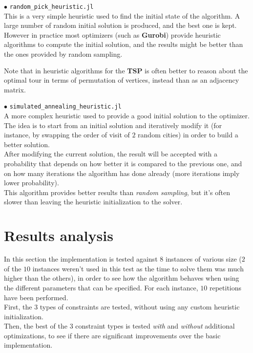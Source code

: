 \documentclass[
12pt,
a4paper,
oneside,
headinclude,
footinclude]{article}
\begin{document}
    $\bullet$ \texttt{random\_pick\_heuristic.jl}\\
    This is a very simple heuristic used to find the initial state of the algorithm. A large number of random initial solution is produced, and the best one is kept.\\
    However in practice most optimizers (such as \textbf{Gurobi}) provide heuristic algorithms to compute the initial solution, and the results might be better than the ones provided by random sampling.
    
    Note that in heuristic algorithms for the \textbf{TSP} is often better to reason about the optimal tour in terms of permutation of vertices, instead than as an adjacency matrix.
    
    
    $\bullet$ \texttt{simulated\_annealing\_heuristic.jl}\\
    A more complex heuristic used to provide a good initial solution to the optimizer.\\
    The idea is to start from an initial solution and iteratively modify it (for instance, by swapping the order of visit of $2$ random cities) in order to build a better solution.\\
    After modifying the current solution, the result will be accepted with a probability that depends on how better it is compared to the previous one, and on how many iterations the algorithm has done already (more iterations imply lower probability).\\
    This algorithm provides better results than \textit{random sampling}, but it's often slower than leaving the heuristic initialization to the solver.

    
    \newpage 
    \section{Results analysis}
    In this section the implementation is tested against $8$ instances of various size ($2$ of the $10$ instances weren't used in this test as the time to solve them was much higher than the others), in order to see how the algorithm behaves when using the different parameters that can be specified. For each instance, $10$ repetitions have been performed. \\
    First, the $3$ types of constraints are tested, without using any custom heuristic initialization. \\
    Then, the best of the $3$ constraint types is tested \textit{with} and \textit{without} additional optimizations, to see if there are significant improvements over the basic implementation.
    
\end{document}
